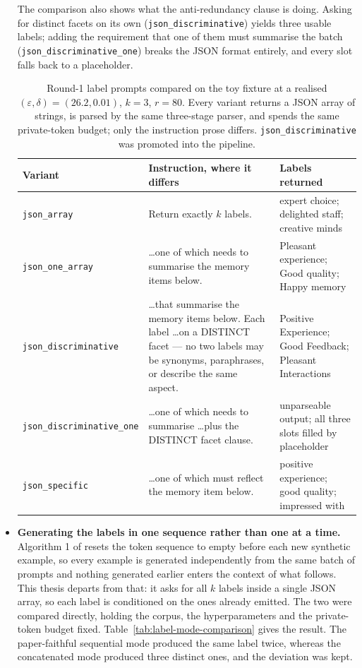 \begin{itemize}
The comparison also shows what the anti-redundancy clause is doing. Asking for distinct facets on its own (\texttt{json\_discriminative}) yields three usable labels; adding the requirement that one of them must summarise the batch (\texttt{json\_discriminative\_one}) breaks the JSON format entirely, and every slot falls back to a placeholder.

\begin{table}[t]
\centering
\small
\begin{tabularx}{\textwidth}{@{}lXl@{}}
\toprule
\textbf{Variant} & \textbf{Instruction, where it differs} & \textbf{Labels returned} \\
\midrule
\texttt{json\_array} & Return exactly $k$ labels. & expert choice; delighted staff; creative minds \\
\addlinespace
\texttt{json\_one\_array} & \dots one of which needs to summarise the memory items below. & Pleasant experience; Good quality; Happy memory \\
\addlinespace
\texttt{json\_discriminative} & \dots that summarise the memory items below. Each label \dots on a DISTINCT facet — no two labels may be synonyms, paraphrases, or describe the same aspect. & Positive Experience; Good Feedback; Pleasant Interactions \\
\addlinespace
\texttt{json\_discriminative\_one} & \dots one of which needs to summarise \dots plus the DISTINCT facet clause. & unparseable output; all three slots filled by placeholder \\
\addlinespace
\texttt{json\_specific} & \dots one of which must reflect the memory item below. & positive experience; good quality; impressed with \\
\bottomrule
\end{tabularx}
\caption{Round-1 label prompts compared on the toy fixture at a realised $(\varepsilon, \delta) = (26.2, 0.01)$, $k = 3$, $r = 80$. Every variant returns a JSON array of strings, is parsed by the same three-stage parser, and spends the same private-token budget; only the instruction prose differs. \texttt{json\_discriminative} was promoted into the pipeline.}
\label{tab:label-prompt-comparison}
\end{table}

\item \textbf{Generating the labels in one sequence rather than one at a time.} Algorithm 1 of \citet{amin2024private} resets the token sequence to empty before each new synthetic example, so every example is generated independently from the same batch of prompts and nothing generated earlier enters the context of what follows. This thesis departs from that: it asks for all $k$ labels inside a single JSON array, so each label is conditioned on the ones already emitted. The two were compared directly, holding the corpus, the hyperparameters and the private-token budget fixed. Table~\ref{tab:label-mode-comparison} gives the result. The paper-faithful sequential mode produced the same label twice, whereas the concatenated mode produced three distinct ones, and the deviation was kept.


\end{itemize}

